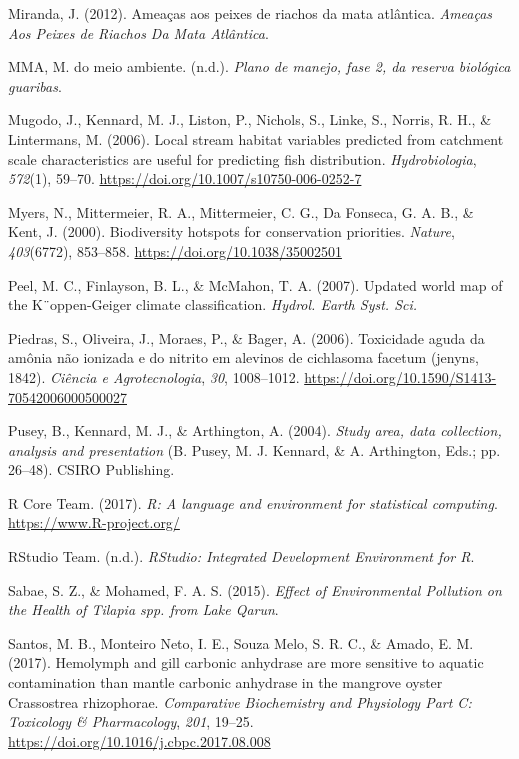 \documentclass[
  american,
  letterpaper,
  DIV=11,
  numbers=noendperiod]{scrartcl}
\newlength{\cslhangindent}
\newenvironment{CSLReferences}[2] %
 {\begin{list}{}{%
  \setlength{\itemindent}{0pt}
  \setlength{\leftmargin}{0pt}
  \setlength{\parsep}{0pt}
  \ifodd #1
   \setlength{\leftmargin}{\cslhangindent}
   \setlength{\itemindent}{-1\cslhangindent}
  \fi
  \setlength{\itemsep}{#2\baselineskip}}}
 {\end{list}}
\begin{document}
\begin{CSLReferences}{1}{0}
Miranda, J. (2012). Ameaças aos peixes de riachos da mata atlântica.
\emph{Ameaças Aos Peixes de Riachos Da Mata Atlântica}.

MMA, M. do meio ambiente. (n.d.). \emph{Plano de manejo, fase 2, da
reserva biológica guaribas}.

Mugodo, J., Kennard, M. J., Liston, P., Nichols, S., Linke, S., Norris,
R. H., \& Lintermans, M. (2006). Local stream habitat variables
predicted from catchment scale characteristics are useful for predicting
fish distribution. \emph{Hydrobiologia}, \emph{572}(1), 59--70.
\url{https://doi.org/10.1007/s10750-006-0252-7}

Myers, N., Mittermeier, R. A., Mittermeier, C. G., Da Fonseca, G. A. B.,
\& Kent, J. (2000). Biodiversity hotspots for conservation priorities.
\emph{Nature}, \emph{403}(6772), 853--858.
\url{https://doi.org/10.1038/35002501}

Peel, M. C., Finlayson, B. L., \& McMahon, T. A. (2007). Updated world
map of the K¨oppen-Geiger climate classi{fi}cation. \emph{Hydrol. Earth
Syst. Sci.}

Piedras, S., Oliveira, J., Moraes, P., \& Bager, A. (2006). Toxicidade
aguda da amônia não ionizada e do nitrito em alevinos de cichlasoma
facetum (jenyns, 1842). \emph{Ciência e Agrotecnologia}, \emph{30},
1008--1012. \url{https://doi.org/10.1590/S1413-70542006000500027}

Pusey, B., Kennard, M. J., \& Arthington, A. (2004). \emph{Study area,
data collection, analysis and presentation} (B. Pusey, M. J. Kennard, \&
A. Arthington, Eds.; pp. 26--48). CSIRO Publishing.

R Core Team. (2017). \emph{R: A language and environment for statistical
computing}. \url{https://www.R-project.org/}

RStudio Team. (n.d.). \emph{RStudio: Integrated Development Environment
for R}.

Sabae, S. Z., \& Mohamed, F. A. S. (2015). \emph{Effect of Environmental
Pollution on the Health of Tilapia spp. from Lake Qarun}.

Santos, M. B., Monteiro Neto, I. E., Souza Melo, S. R. C., \& Amado, E.
M. (2017). Hemolymph and gill carbonic anhydrase are more sensitive to
aquatic contamination than mantle carbonic anhydrase in the mangrove
oyster Crassostrea rhizophorae. \emph{Comparative Biochemistry and
Physiology Part C: Toxicology \& Pharmacology}, \emph{201}, 19--25.
\url{https://doi.org/10.1016/j.cbpc.2017.08.008}


\end{CSLReferences}
\end{document}
